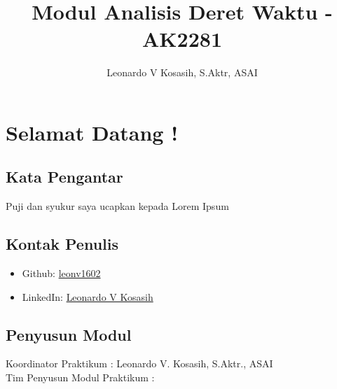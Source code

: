 \documentclass[
]{book}
\title{Modul Analisis Deret Waktu - AK2281}
\author{Leonardo V Kosasih, S.Aktr, ASAI}
\date{}
\providecommand{\tightlist}{%
  \setlength{\itemsep}{0pt}\setlength{\parskip}{0pt}}
\begin{document}
\maketitle

{
\setcounter{tocdepth}{1}
\tableofcontents
}

\hypertarget{selamat-datang}{%
\chapter*{Selamat Datang !}\label{selamat-datang}}

\hypertarget{kata-pengantar}{%
\section*{Kata Pengantar}\label{kata-pengantar}}

Puji dan syukur saya ucapkan kepada Lorem Ipsum

\hypertarget{kontak-penulis}{%
\section*{Kontak Penulis}\label{kontak-penulis}}

\begin{itemize}
\tightlist
\item
  Github: \href{https://github.com/leonv1602}{leonv1602}\\
\item
  LinkedIn: \href{https://www.linkedin.com/in/leonardo-valentino-kosasih-4203a1182/}{Leonardo V Kosasih}
\end{itemize}

\hypertarget{penyusun-modul}{%
\section*{Penyusun Modul}\label{penyusun-modul}}

Koordinator Praktikum : Leonardo V. Kosasih, S.Aktr., ASAI\\
Tim Penyusun Modul Praktikum :
\end{document}
